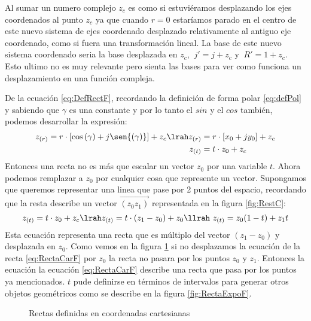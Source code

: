 \begin{figure}[H]
    \centering
    
\end{figure}
Al sumar un numero complejo $z_c$ es como si estuviéramos desplazando los ejes coordenados al punto $z_c$ ya que cuando $r=0$
estaríamos parado en el centro de este nuevo sistema de ejes coordenado desplazado relativamente al antiguo eje coordenado, como si fuera una transformación lineal. La base de este nuevo sistema coordenado seria la base desplazada en $z_c$, $\ j'=j+z_c$ y $\ R'=1+z_c$. Esto ultimo no es muy relevante pero sienta las bases para ver como funciona un desplazamiento en una función compleja.

De la ecuación \ref{eq:DefRectF}, recordando la definición de forma polar \ref{eq:defPol} y sabiendo que $\gamma$ es una constante y por lo tanto el $sin$ y el $cos$ también, podemos desarrollar la expresión:
\begin{equation}
    \begin{aligned}
        z_{(r)}=r\cdot[\cos{(\gamma)}+j\sen{(\gamma)}]+z_c \lrah z_{(r)}&=r\cdot[x_0+jy_0]+z_c\\                                                           z_{(t)}&=t\cdot z_0+z_c
    \end{aligned}
\end{equation}
Entonces una recta no es más que escalar un vector $z_0$ por una variable $t$. Ahora podemos remplazar a $z_0$ por cualquier cosa que represente un vector. Supongamos que queremos representar una linea que pase por 2 puntos del espacio, recordando que la resta describe un vector $\overrightarrow{(z_0z_1)}$ representada en la figura \ref{fig:RestC}:
\begin{equation}\label{eq:RectaCarF}
     z_{(t)}=t\cdot z_0+z_c \lrah z_{(t)}=t\cdot(z_1-z_0)+z_0 \llrah\ z_{(t)}=z_0(1-t)+z_1t
\end{equation}
Esta ecuación representa una recta que es múltiplo del vector $(z_1-z_0)$ y desplazada en $z_0$.
Como vemos en la figura \ref{fig:CartRectF} si no desplazamos la ecuación de la recta \ref{eq:RectaCarF} por $z_0$ la recta no pasara por los puntos $z_0$ y $z_1$. Entonces la ecuación la ecuación \ref{eq:RectaCarF} describe una recta que pasa por los puntos ya mencionados. $t$ pude definirse en términos de intervalos para generar otros objetos geométricos como se describe en la figura \ref{fig:RectaExpoF}.
\begin{figure}[H]
    \centering
    \begin{minipage}{0.4\textwidth}
        \centering
        
    \end{minipage}
    \begin{minipage}{0.4\textwidth}
        \centering
        
    \end{minipage}
    \caption{Rectas definidas en coordenadas cartesianas}
    \label{fig:CartRectF}
\end{figure}
